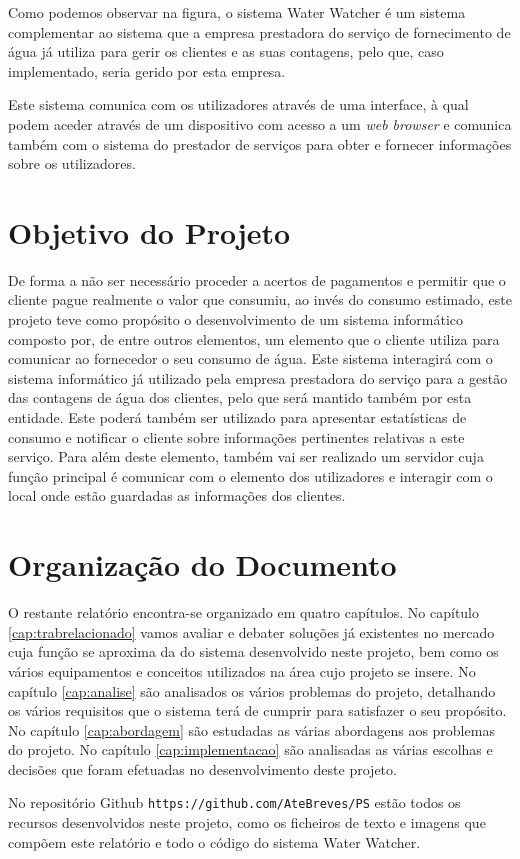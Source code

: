 \vspace{1cm}

Como podemos observar na figura, o sistema Water Watcher é um sistema complementar ao sistema que a empresa prestadora do serviço de fornecimento de água já utiliza para gerir os clientes e as suas contagens, pelo que, caso implementado, seria gerido por esta empresa.\par
Este sistema comunica com os utilizadores através de uma interface, à qual podem aceder através de um dispositivo com acesso a um \textit{web browser} e comunica também com o sistema do prestador de serviços para obter e fornecer informações sobre os utilizadores.

%
%
\section{Objetivo do Projeto} \label{sec11}

De forma a não ser necessário proceder a acertos de pagamentos e permitir que o cliente pague realmente o valor que consumiu, ao invés do consumo estimado, este projeto teve como propósito o desenvolvimento de um sistema informático composto por, de entre outros elementos, um elemento que o cliente utiliza para comunicar ao fornecedor o seu consumo de água. Este sistema interagirá com o sistema informático já utilizado pela empresa prestadora do serviço para a gestão das contagens de água dos clientes, pelo que será mantido também por esta entidade. Este poderá também ser utilizado para apresentar estatísticas de consumo e notificar o cliente sobre informações pertinentes relativas a este serviço. Para além deste elemento, também vai ser realizado um servidor cuja função principal é comunicar com o elemento dos utilizadores e interagir com o local onde estão guardadas as informações dos clientes.

\section{Organização do Documento} \label{sec12}

O restante relatório encontra-se organizado em quatro capítulos. No capítulo \ref{cap:trabrelacionado} vamos avaliar e debater soluções já existentes no mercado cuja função se aproxima da do sistema desenvolvido neste projeto, bem como os vários equipamentos e conceitos utilizados na área cujo projeto se insere. No capítulo \ref{cap:analise} são analisados os vários problemas do projeto, detalhando os vários requisitos que o sistema terá de cumprir para satisfazer o seu propósito. No capítulo \ref{cap:abordagem} são estudadas as várias abordagens aos problemas do projeto. No capítulo \ref{cap:implementacao} são analisadas as várias escolhas e decisões que foram efetuadas no desenvolvimento deste projeto.\par
No repositório Github \texttt{https://github.com/AteBreves/PS} estão todos os recursos desenvolvidos neste projeto, como os ficheiros de texto e imagens que compõem este relatório e todo o código do sistema Water Watcher.

